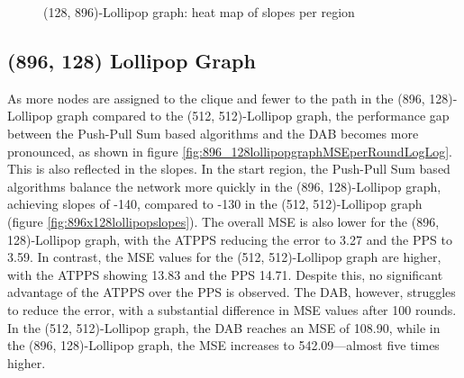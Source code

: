\begin{figure}
    \centering
    \caption{(128, 896)-Lollipop graph: heat map of slopes per region}
    \label{fig:128_896lollipopslopes}
\end{figure}

\subsection{(896, 128) Lollipop Graph}\label{subsec:896_128lollipop}
As more nodes are assigned to the clique and fewer to the path in the (896, 128)-Lollipop graph compared to the (512, 512)-Lollipop graph, the performance gap between the Push-Pull Sum based algorithms and the DAB becomes more pronounced, as shown in figure \ref{fig:896_128lollipopgraphMSEperRoundLogLog}. This is also reflected in the slopes. In the start region, the Push-Pull Sum based algorithms balance the network more quickly in the (896, 128)-Lollipop graph, achieving slopes of -140, compared to -130 in the (512, 512)-Lollipop graph (figure \ref{fig:896x128lollipopslopes}). The overall MSE is also lower for the (896, 128)-Lollipop graph, with the ATPPS reducing the error to 3.27 and the PPS to 3.59. In contrast, the MSE values for the (512, 512)-Lollipop graph are higher, with the ATPPS showing 13.83 and the PPS 14.71. Despite this, no significant advantage of the ATPPS over the PPS is observed. The DAB, however, struggles to reduce the error, with a substantial difference in MSE values after 100 rounds. In the (512, 512)-Lollipop graph, the DAB reaches an MSE of 108.90, while in the (896, 128)-Lollipop graph, the MSE increases to 542.09—almost five times higher.

